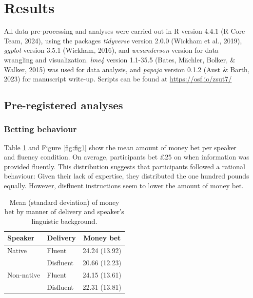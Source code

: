 \documentclass[
  man,floatsintext]{apa7}
\begin{document}
\hypertarget{results}{%
\section{Results}\label{results}}

All data pre-processing and analyses were carried out in R version 4.4.1 (R Core Team, 2024), using the packages \emph{tidyverse} version 2.0.0 (Wickham et al., 2019), \emph{ggplot} version 3.5.1 (Wickham, 2016), and \emph{wesanderson} version for data wrangling and visualization. \emph{lme4} version 1.1-35.5 (Bates, Mächler, Bolker, \& Walker, 2015) was used for data analysis, and \emph{papaja} version 0.1.2 (Aust \& Barth, 2023) for manuscript write-up. Scripts can be found at \url{https://osf.io/zsut7/}

\hypertarget{pre-registered-analyses}{%
\subsection{Pre-registered analyses}\label{pre-registered-analyses}}

\hypertarget{betting-behaviour}{%
\subsubsection{Betting behaviour}\label{betting-behaviour}}

Table \ref{tab:tab-dist-money} and Figure \ref{fig:fig1} show the mean amount of money bet per speaker and fluency condition. On average, participants bet £25 on when information was provided fluently. This distribution suggests that participants followed a rational behaviour: Given their lack of expertise, they distributed the one hundred pounds equally. However, disfluent instructions seem to lower the amount of money bet.

\begin{table}[tbp]

\begin{center}
\begin{threeparttable}

\caption{\label{tab:tab-dist-money}Mean (standard deviation) of money bet by manner of delivery and speaker’s linguistic
background.}

\begin{tabular}{lll}
\toprule
Speaker & \multicolumn{1}{c}{Delivery} & \multicolumn{1}{c}{Money bet}\\
\midrule
Native & Fluent & 24.24 (13.92)\\
 & Disfluent & 20.66 (12.23)\\
Non-native & Fluent & 24.15 (13.61)\\
 & Disfluent & 22.31 (13.81)\\
\bottomrule
\end{tabular}

\end{threeparttable}
\end{center}

\end{table}
\end{document}
